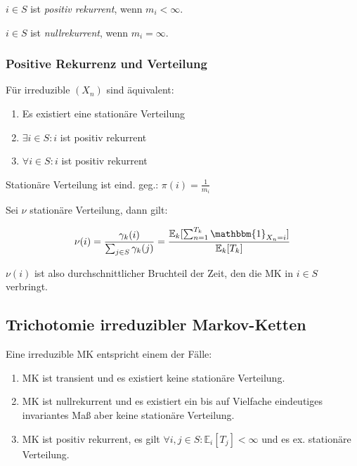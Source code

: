 $i \in S$ ist \emph{positiv rekurrent}, wenn $m_i < \infty$.

$i \in S$ ist \emph{nullrekurrent}, wenn $m_i = \infty$.

\subsubsection*{Positive Rekurrenz und Verteilung}

Für irreduzible $(X_n)$ sind äquivalent:

\begin{enumerate}[label=(\alph*)]
	\item Es existiert eine stationäre Verteilung
	\item $\exists i \in S : i$ ist positiv rekurrent
	\item $\forall i \in S : i$ ist positiv rekurrent
\end{enumerate}

Stationäre Verteilung ist eind. geg.: $\pi(i) = \frac{1}{m_i}$

Sei $\nu$ stationäre Verteilung, dann gilt:

$$\nu(i) = \frac{\gamma_k(i)}{\sum_{j \in S} \gamma_k(j)} = \frac{\mathbb{E}_k[\sum_{n=1}^{T_k} \mathbbm{1}_{X_n = i}]}{\mathbb{E}_k[T_k]}$$

$\nu(i)$ ist also durchschnittlicher Bruchteil der Zeit, den die MK in $i \in S$ verbringt.

\subsection*{Trichotomie irreduzibler Markov-Ketten}

Eine irreduzible MK entspricht einem der Fälle:

\begin{enumerate}[label=(\alph*)]
	\item MK ist transient und es existiert keine stationäre Verteilung.
	\item MK ist nullrekurrent und es existiert ein bis auf Vielfache eindeutiges invariantes Maß aber keine stationäre Verteilung.
	\item MK ist positiv rekurrent, es gilt $\forall i, j \in S : \mathbb{E}_i[T_j] < \infty$ und es ex. stationäre Verteilung.
\end{enumerate}
